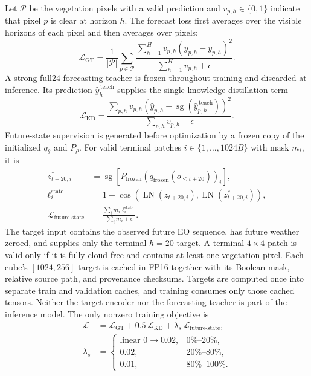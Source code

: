 \documentclass[letterpaper]{article} %
\begin{document}
Let $\mathcal P$ be the vegetation pixels with a valid prediction and
$v_{p,h}\in\{0,1\}$ indicate that pixel $p$ is clear at horizon $h$. The
forecast loss first averages over the visible horizons of each pixel and then
averages over pixels:
\begin{equation}
\mathcal L_{\mathrm{GT}}
=\frac{1}{|\mathcal P|}\sum_{p\in\mathcal P}
\frac{\sum_{h=1}^{H}v_{p,h}(\widehat y_{p,h}-y_{p,h})^2}
{\sum_{h=1}^{H}v_{p,h}+\epsilon}.
\label{eq:gtloss}
\end{equation}
A strong full24 forecasting teacher is frozen throughout training and
discarded at inference. Its prediction
$\widehat y_h^{\,\mathrm{teach}}$ supplies the single knowledge-distillation
term
\begin{equation}
\mathcal L_{\mathrm{KD}}
=\frac{\sum_{p,h}v_{p,h}
(\widehat y_{p,h}-\operatorname{sg}(\widehat y_{p,h}^{\,\mathrm{teach}}))^2}
{\sum_{p,h}v_{p,h}+\epsilon}.
\label{eq:kdloss}
\end{equation}
Future-state supervision is generated before optimization by a frozen copy of
the initialized $q_\theta$ and $P_\rho$. For valid terminal patches
$i\in\{1,\ldots,1024B\}$ with mask $m_i$, it is
\begin{equation}
\begin{aligned}
z^*_{t+20,i}
&=\operatorname{sg}\!\left[
P_{\mathrm{frozen}}\!\left(
q_{\mathrm{frozen}}(o_{\leq t+20})\right)_i\right],\\
\ell_i^{\mathrm{state}}
&=1-\cos\!\left(
\operatorname{LN}(z_{t+20,i}),
\operatorname{LN}(z^*_{t+20,i})\right),\\
\mathcal L_{\mathrm{future\text{-}state}}
&=\frac{\sum_i m_i\ell_i^{\mathrm{state}}}
{\sum_i m_i+\epsilon}.
\end{aligned}
\label{eq:futurestate}
\end{equation}
The target input contains the observed future EO sequence, has future weather
zeroed, and supplies only the terminal $h=20$ target. A terminal $4\times4$
patch is valid only if it is fully cloud-free and contains at least one
vegetation pixel. Each cube's $[1024,256]$ target is cached in FP16 together
with its Boolean mask, relative source path, and provenance checksums. Targets
are computed once into separate train and validation caches, and training
consumes only those cached tensors. Neither the target encoder nor the
forecasting teacher is part of the inference model. The only nonzero training
objective is
\begin{equation}
\begin{aligned}
\mathcal L
&=\mathcal L_{\mathrm{GT}}
+0.5\,\mathcal L_{\mathrm{KD}}
+\lambda_s\,\mathcal L_{\mathrm{future\text{-}state}},\\
\lambda_s&=
\begin{cases}
\text{linear }0\rightarrow0.02, & 0\% \text{--}20\%,\\
0.02, & 20\% \text{--}80\%,\\
0.01, & 80\% \text{--}100\%.
\end{cases}
\end{aligned}
\label{eq:total}
\end{equation}
\end{document}
